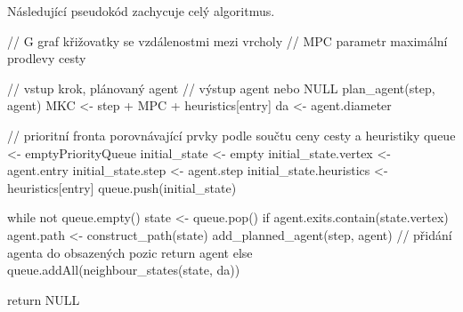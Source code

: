 Následující pseudokód zachycuje celý  algoritmus.

\begin{code}[fontsize=\footnotesize]
// G graf křižovatky se vzdálenostmi mezi vrcholy
// MPC parametr maximální prodlevy cesty

// vstup krok, plánovaný agent
// výstup agent nebo NULL
plan_agent(step, agent)
  MKC <- step + MPC + heuristics[entry]
  da <- agent.diameter

  // prioritní fronta porovnávající prvky podle součtu ceny cesty a heuristiky
  queue <- emptyPriorityQueue
  initial_state <- empty
  initial_state.vertex <- agent.entry
  initial_state.step <- agent.step
  initial_state.heuristics <- heuristics[entry]
  queue.push(initial_state)

  while not queue.empty()
    state <- queue.pop()
    if agent.exits.contain(state.vertex)
      agent.path <- construct_path(state)
      add_planned_agent(step, agent)  // přidání agenta do obsazených pozic
      return agent
    else
      queue.addAll(neighbour_states(state, da))

  return NULL
\end{code}
